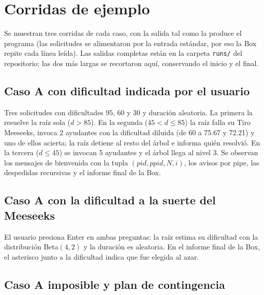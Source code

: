 

\section{Corridas de ejemplo}\label{sec:corridas}

Se muestran tres corridas de cada caso, con la salida tal como la produce el programa
(las solicitudes se alimentaron por la entrada estándar, por eso la Box repite cada línea
leída). Las salidas completas están en la carpeta \texttt{runs/} del repositorio; las dos
más largas se recortaron aquí, conservando el inicio y el final.

\subsection{Caso A con dificultad indicada por el usuario}

Tres solicitudes con dificultades 95, 60 y 30 y duración aleatoria. La primera la resuelve
la raíz sola ($d>85$). En la segunda ($45<d\le85$) la raíz falla su Tiro Meeseeks, invoca 2
ayudantes con la dificultad diluida (de 60 a 75.67 y 72.21) y uno de ellos acierta; la
raíz detiene al resto del árbol e informa quién resolvió. En la tercera ($d\le45$) se
invocan 5 ayudantes y el árbol llega al nivel 3. Se observan los mensajes de bienvenida
con la tupla $(pid, ppid, N, i)$, los avisos por pipe, las despedidas recursivas y el
informe final de la Box.



\subsection{Caso A con la dificultad a la suerte del Meeseeks}

El usuario presiona Enter en ambas preguntas: la raíz estima su dificultad con la
distribución Beta$(4,2)$ y la duración es aleatoria. En el informe final de la Box, el
asterisco junto a la dificultad indica que fue elegida al azar.



\subsection{Caso A imposible y plan de contingencia}


